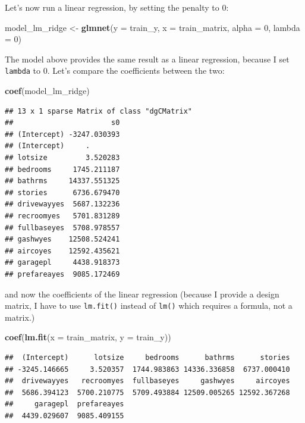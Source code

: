 \documentclass[]{gitbook}
\newenvironment{Shaded}{\begin{snugshade}}{\end{snugshade}}
\newcommand{\DataTypeTok}[1]{\textcolor[rgb]{0.13,0.29,0.53}{#1}}
\newcommand{\DecValTok}[1]{\textcolor[rgb]{0.00,0.00,0.81}{#1}}
\newcommand{\KeywordTok}[1]{\textcolor[rgb]{0.13,0.29,0.53}{\textbf{#1}}}
\newcommand{\NormalTok}[1]{#1}
\newcommand{\StringTok}[1]{\textcolor[rgb]{0.31,0.60,0.02}{#1}}
\begin{document}
Let's now run a linear regression, by setting the penalty to 0:

\begin{Shaded}
\begin{Highlighting}[]
\NormalTok{model_lm_ridge <-}\StringTok{ }\KeywordTok{glmnet}\NormalTok{(}\DataTypeTok{y =}\NormalTok{ train_y, }\DataTypeTok{x =}\NormalTok{ train_matrix, }\DataTypeTok{alpha =} \DecValTok{0}\NormalTok{, }\DataTypeTok{lambda =} \DecValTok{0}\NormalTok{)}
\end{Highlighting}
\end{Shaded}

The model above provides the same result as a linear regression, because I set \texttt{lambda} to 0. Let's
compare the coefficients between the two:

\begin{Shaded}
\begin{Highlighting}[]
\KeywordTok{coef}\NormalTok{(model_lm_ridge)}
\end{Highlighting}
\end{Shaded}

\begin{verbatim}
## 13 x 1 sparse Matrix of class "dgCMatrix"
##                       s0
## (Intercept) -3247.030393
## (Intercept)     .       
## lotsize         3.520283
## bedrooms     1745.211187
## bathrms     14337.551325
## stories      6736.679470
## drivewayyes  5687.132236
## recroomyes   5701.831289
## fullbaseyes  5708.978557
## gashwyes    12508.524241
## aircoyes    12592.435621
## garagepl     4438.918373
## prefareayes  9085.172469
\end{verbatim}

and now the coefficients of the linear regression (because I provide a design matrix, I have to use
\texttt{lm.fit()} instead of \texttt{lm()} which requires a formula, not a matrix.)

\begin{Shaded}
\begin{Highlighting}[]
\KeywordTok{coef}\NormalTok{(}\KeywordTok{lm.fit}\NormalTok{(}\DataTypeTok{x =}\NormalTok{ train_matrix, }\DataTypeTok{y =}\NormalTok{ train_y))}
\end{Highlighting}
\end{Shaded}

\begin{verbatim}
##  (Intercept)      lotsize     bedrooms      bathrms      stories 
## -3245.146665     3.520357  1744.983863 14336.336858  6737.000410 
##  drivewayyes   recroomyes  fullbaseyes     gashwyes     aircoyes 
##  5686.394123  5700.210775  5709.493884 12509.005265 12592.367268 
##     garagepl  prefareayes 
##  4439.029607  9085.409155
\end{verbatim}
\end{document}

